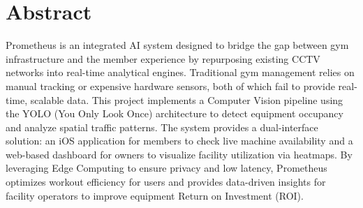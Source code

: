 \chapter*{Abstract}
\label{chap:abstract}

Prometheus is an integrated AI system designed to bridge the gap between gym infrastructure and the member experience by 
repurposing existing CCTV networks into real-time analytical engines. Traditional gym management relies on manual tracking 
or expensive hardware sensors, both of which fail to provide real-time, scalable data. This project implements a 
Computer Vision pipeline using the YOLO (You Only Look Once) architecture to detect equipment occupancy and analyze spatial 
traffic patterns. The system provides a dual-interface solution: an iOS application for members to check live machine availability 
and a web-based dashboard for owners to visualize facility utilization via heatmaps. By leveraging Edge Computing to ensure 
privacy and low latency, Prometheus optimizes workout efficiency for users and provides data-driven insights for facility 
operators to improve equipment Return on Investment (ROI).